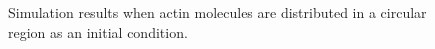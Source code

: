 \documentclass[a4paper,12pt, oneside]{book}
\begin{document}
\begin{figure}[tbp]
 \caption{Simulation results when actin molecules are distributed in a circular region as an initial condition.}
 \label{fig:res5}
\end{figure}
\end{document}
